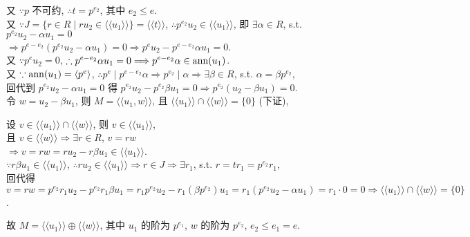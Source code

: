 \documentclass{note}
\begin{document}
\begin{pf}
    又 $\because p$ 不可约, $\therefore t=p^{e_2}$, 其中 $e_2\leq e$.\\
    又 $\because J=\{r\in R\mid ru_2\in\langle\langle u_1\rangle\rangle\}=\langle\langle t\rangle\rangle$, $\therefore p^{e_2}u_2\in\langle\langle u_1\rangle\rangle$, 即 $\exists\alpha\in R$, s.t. $p^{e_2}u_2-\alpha u_1=0$\\
    $\Longrightarrow p^{e-e_2}(p^{e_2}u_2-\alpha u_1)=0\Longrightarrow p^eu_2-p^{e-e_2}\alpha u_1=0$.\\
    又 $\because p^eu_2=0$, $\therefore p^{e-e_2}\alpha u_1=0\Longrightarrow p^{e-e_2}\alpha\in\operatorname{ann}(u_1)$.\\
    又 $\because\operatorname{ann}(u_1)=\langle p^e\rangle$, $\therefore p^e\mid p^{e-e_2}\alpha\Longrightarrow p^{e_2}\mid\alpha\Longrightarrow\exists\beta\in R$, s.t. $\alpha=\beta p^{e_2}$,\\
    回代到 $p^{e_2}u_2-\alpha u_1=0$ 得 $p^{e_2}u_2-p^{e_2}\beta u_1=0\Longrightarrow p^{e_2}(u_2-\beta u_1)=0$.\\
    令 $w=u_2-\beta u_1$, 则 $M=\langle\langle u_1,w\rangle\rangle$, 且 $\langle\langle u_1\rangle\rangle\cap\langle\langle w\rangle\rangle=\{0\}$ (下证),\\
    \begin{pf}
        设 $v\in\langle\langle u_1\rangle\rangle\cap\langle\langle w\rangle\rangle$, 则 $v\in\langle\langle u_1\rangle\rangle$,\\
        且 $v\in\langle\langle w\rangle\rangle\Longrightarrow\exists r\in R$, $v=rw$\\
        $\Longrightarrow v=rw=ru_2-r\beta u_1\in\langle\langle u_1\rangle\rangle$.\\
        $\because r\beta u_1\in\langle\langle u_1\rangle\rangle$, $\therefore ru_2\in\langle\langle u_1\rangle\rangle\Longrightarrow r\in J\Longrightarrow\exists r_1$, s.t. $r=tr_1=p^{e_2}r_1$,\\
        回代得 $v=rw=p^{e_2}r_1u_2-p^{e_2}r_1\beta u_1=r_1p^{e_2}u_2-r_1(\beta p^{e_2})u_1=r_1(p^{e_2}u_2-\alpha u_1)=r_1\cdot 0=0\Longrightarrow \langle\langle u_1\rangle\rangle\cap\langle\langle w\rangle\rangle=\{0\}$.
    \end{pf}
    故 $M=\langle\langle u_1\rangle\rangle\oplus\langle\langle w\rangle\rangle$, 其中 $u_1$ 的阶为 $p^{e_1}$, $w$ 的阶为 $p^{e_2}$, $e_2\leq e_1=e$.
\end{pf}
\end{document}
